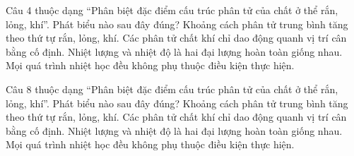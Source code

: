 \begin{ex}
Câu 4 thuộc dạng “Phân biệt đặc điểm cấu trúc phân tử của chất ở thể rắn, lỏng, khí”. Phát biểu nào sau đây đúng?
\choice
{\True Khoảng cách phân tử trung bình tăng theo thứ tự rắn, lỏng, khí.}
{Các phân tử chất khí chỉ dao động quanh vị trí cân bằng cố định.}
{Nhiệt lượng và nhiệt độ là hai đại lượng hoàn toàn giống nhau.}
{Mọi quá trình nhiệt học đều không phụ thuộc điều kiện thực hiện.}
\end{ex}

\begin{ex}
Câu 8 thuộc dạng “Phân biệt đặc điểm cấu trúc phân tử của chất ở thể rắn, lỏng, khí”. Phát biểu nào sau đây đúng?
\choice
{\True Khoảng cách phân tử trung bình tăng theo thứ tự rắn, lỏng, khí.}
{Các phân tử chất khí chỉ dao động quanh vị trí cân bằng cố định.}
{Nhiệt lượng và nhiệt độ là hai đại lượng hoàn toàn giống nhau.}
{Mọi quá trình nhiệt học đều không phụ thuộc điều kiện thực hiện.}
\end{ex}
